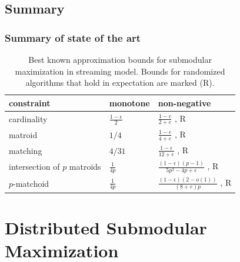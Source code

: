 \documentclass{beamer}
\newcommand{\eps}{\epsilon}
\begin{document}
\subsection{Summary}
\begin{frame}
  \frametitle{Summary of state of the art}
\begin{table}[t]
\centering
\begin{tabular}{|l|l|l|}
\hline
constraint & monotone  &  non-negative \\
\hline
cardinality & $\frac{1-\eps}{2}$ \cite{BMK+14} & $\frac{1 - \eps}{2 + e}$ \cite{CGQ15}, R\\
\hline
matroid & $1/4$ \cite{CK14} & $\frac{1 - \eps}{4 + e}$ \cite{CGQ15},  R \\
\hline
matching & $4/31$ \cite{CK14} & $\frac{1 - \eps}{12 + \eps}$ \cite{CGQ15}, R \\
\hline
intersection of $p$ matroids & $\frac{1}{4p}$ \cite{CK14} & $\frac{(1 - \eps)(p - 1)}{5p^2 -4p + \eps}$ \cite{CGQ15}, R\\
\hline
$p$-matchoid & $\frac{1}{4p}$ \cite{CGQ15} & $\frac{(1-\eps)(2-o(1))}{(8+e)p}$ \cite{CGQ15}, R\\
\hline
\end{tabular}
\caption{Best known approximation bounds for submodular maximization in streaming model. Bounds for randomized algorithms that hold in expectation are marked (R).}
\label{table:streaming}
\end{table}

\end{frame}





\section{Distributed Submodular Maximization}
\end{document}
